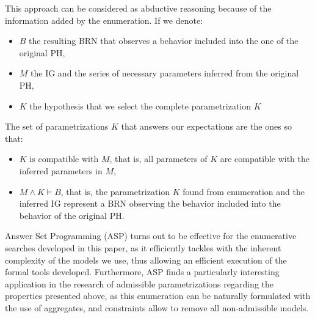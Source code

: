 This approach can be considered as abductive reasoning because of the information added by the enumeration.
If we denote:
\begin{itemize}
  \item $B$ the resulting BRN that observes a behavior included into the one of the original PH,
  \item $M$ the IG and the series of necessary parameters inferred from the original PH,
  \item $K$ the hypothesis that we select the complete parametrization $K$
\end{itemize}
The set of parametrizations $K$ that answers our expectations are the ones so that:
\begin{itemize}
  \item $K$ is compatible with $M$, that is, all parameters of $K$ are compatible with the inferred parameters in $M$,
  \item $M \wedge K \models B$, that is, the parametrization $K$ found from enumeration and the inferred IG represent a BRN observing the behavior included into the behavior of the original PH.
\end{itemize}

Answer Set Programming (ASP) \cite{Baral03} turns out to be effective for the enumerative searches developed in this paper,
as it efficiently tackles with the inherent complexity of the models we use, thus allowing an efficient execution of the formal tools developed. %
Furthermore, ASP finds a particularly interesting application in the research of admissible parametrizations regarding the properties presented above, as this enumeration can be naturally formulated with the use of aggregates, and constraints allow to remove all non-admissible models.



